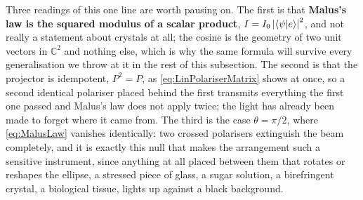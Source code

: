             Three readings of this one line are worth pausing on. The first is that \textbf{Malus's law is the squared modulus of a scalar product}, $I=I_0\left|\braket{\psi|e}\right|^2$, and not really a statement about crystals at all; the cosine is the geometry of two unit vectors in $\mathbb{C}^2$ and nothing else, which is why the same formula will survive every generalisation we throw at it in the rest of this subsection. The second is that the projector is idempotent, $P^2=P$, as \ref{eq:LinPolariserMatrix} shows at once, so a second identical polariser placed behind the first transmits everything the first one passed and Malus's law does not apply twice; the light has already been made to forget where it came from. The third is the case $\theta=\pi/2$, where \ref{eq:MalusLaw} vanishes identically: two crossed polarisers extinguish the beam completely, and it is exactly this null that makes the arrangement such a sensitive instrument, since anything at all placed between them that rotates or reshapes the ellipse, a stressed piece of glass, a sugar solution, a birefringent crystal, a biological tissue, lights up against a black background.

